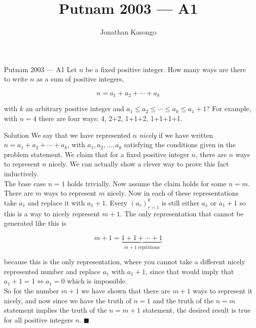 \documentclass{article}
\author{Jonathan Kasongo}
\title{Putnam 2003 --- A1}
\begin{document}
\maketitle

\begin{problem}{Putnam 2003 --- A1}
Let $n$ be a fixed positive integer. How many ways are there to
write $n$ as a sum of positive integers,

$$
n = a_1 + a_2 + \cdots + a_k
$$

with $k$ an arbitrary positive integer and
$a_1 \leq a_2 \leq \cdots \leq a_k \leq a_1 + 1$? For example, with $n=4$
there are four ways: 4, 2+2, 1+1+2, 1+1+1+1.
\end{problem}

\begin{solution}{Solution}
We say that we have represented $n$ \textit{nicely} if we have written
$n = a_1 + a_2 + \cdots + a_k$, with $a_1, a_2, ...,a_k$ satisfying the
conditions given in the problem statement.
We claim that for a fixed positive integer $n$, there are $n$ ways to
represent $n$ nicely. We can actually show a clever way to
prove this fact inductively. \\

The base case $n=1$ holds trivially. Now assume the claim holds for some
$n=m$. There are $m$ ways to represent $m$ nicely. Now in each of these
representations take $a_1$ and replace it with $a_1 + 1$. Every
$(a_r)_{r=1}^k$ is still either $a_1$ or $a_1 + 1$ so this is a way to
nicely represent $m+1$. The only representation that cannot be generated like this is

$$m+1 = \underbrace{1+1+\cdots+1}_{m + 1 \; \text{repititions}}$$

because this is the only representation, where you cannot take a different
nicely represented number and replace $a_1$ with $a_1 + 1$, since that
would imply that $a_1 + 1 = 1 \iff a_1 = 0$ which is impossible.\\

So for the number $m+1$ we have shown that there are $m+1$ ways to
represent it nicely, and now since we have the truth of $n=1$ and the
truth of the $n=m$ statement implies the truth of the $n=m+1$ statement,
the desired result is true for all positive integers $n$. $\blacksquare$
\end{solution}
\end{document}
